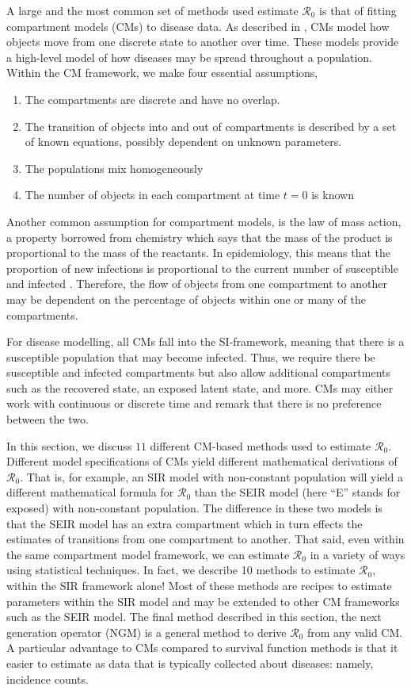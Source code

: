 \documentclass[12pt]{article}
\newcommand{\xxsir}{\ensuremath{11}} %
\newcommand{\rr}{\ensuremath{\mathcal{R}_0}}
\begin{document}
A large and the most common set of methods used estimate $\rr$ is that of fitting compartment models (CMs) to disease data.  As described in \cite{daley2001epidemic},  CMs model how objects move from one discrete state to another over time.  These models provide a high-level model of how diseases may be spread throughout a population.  Within the CM framework, we make four essential assumptions,
\begin{enumerate}
\item The compartments are discrete and have no overlap.
\item The transition of objects into and out of compartments is described by a set of known equations, possibly dependent on unknown parameters.
\item The populations mix homogeneously
  \item The number of objects in each compartment at time $t=0$ is known
  \end{enumerate}  


Another common assumption for compartment models, is the law of mass action, a property borrowed from chemistry which says that the mass of the product is proportional to the mass of the reactants.  In epidemiology, this means that the proportion of new infections is proportional to the current  number of susceptible and infected \citep{anderson1992}.  Therefore, the flow of objects from one compartment to another may be dependent on the percentage of objects within one or many of the compartments. 

For disease modelling, all CMs fall into the SI-framework, meaning that there is a susceptible population that may become infected.  Thus, we require there be susceptible and infected compartments but also allow additional compartments such as the recovered state, an exposed latent state, and more.  CMs may either work with continuous or discrete time and \cite{getz2006} remark that there is no preference between the two.

In this section, we discuss $\xxsir$ different CM-based methods used to estimate $\rr$.  Different model specifications of CMs yield different mathematical derivations of $\rr$.  That is, for example, an SIR model with non-constant population will yield a different mathematical formula for $\rr$ than the SEIR model (here ``E'' stands for exposed) with non-constant population.  The difference in these two models is that the SEIR model has an extra compartment which in turn effects the estimates of transitions from one compartment to another.  That said, even within the same compartment model framework, we can estimate $\rr$ in a variety of ways using statistical techniques.  In fact, we describe 10 methods to estimate $\rr$, within the SIR framework alone!  Most of these methods are recipes to estimate parameters within the SIR model and may be extended to other CM frameworks such as the SEIR model.  The final method described in this section, the next generation operator (NGM) is a general method to derive $\rr$ from any valid CM.  A particular advantage to CMs compared to survival function methods is that it easier to estimate as data that is typically collected about diseases: namely, incidence counts.  
\end{document}
